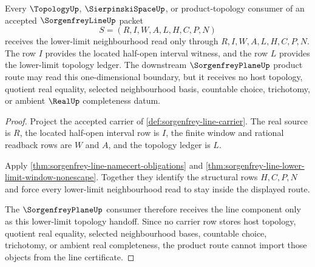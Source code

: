 \begin{theorem}
\label{thm:sorgenfrey-line-lower-limit-topology-handoff}
Every $\TopologyUp$, $\SierpinskiSpaceUp$, or product-topology consumer of an accepted $\SorgenfreyLineUp$ packet
$$
S=(R,I,W,A,L,H,C,P,N)
$$
receives the lower-limit neighbourhood read only through $R,I,W,A,L,H,C,P,N$. The row $I$ provides the located half-open interval witness, and the row $L$ provides the lower-limit topology ledger. The downstream $\SorgenfreyPlaneUp$ product route may read this one-dimensional boundary, but it receives no host topology, quotient real equality, selected neighbourhood basis, countable choice, trichotomy, or ambient $\RealUp$ completeness datum.
\end{theorem}
\begin{proof}
Project the accepted carrier of \autoref{def:sorgenfrey-line-carrier}. The real source is $R$, the located half-open interval row is $I$, the finite window and rational readback rows are $W$ and $A$, and the topology ledger is $L$.

Apply \autoref{thm:sorgenfrey-line-namecert-obligations} and \autoref{thm:sorgenfrey-line-lower-limit-window-nonescape}. Together they identify the structural rows $H,C,P,N$ and force every lower-limit neighbourhood read to stay inside the displayed route.

The $\SorgenfreyPlaneUp$ consumer therefore receives the line component only as this lower-limit topology handoff. Since no carrier row stores host topology, quotient real equality, selected neighbourhood bases, countable choice, trichotomy, or ambient real completeness, the product route cannot import those objects from the line certificate.
\end{proof}


\begin{closurestatus}{\SorgenfreyLineUp}
  \theoryclosure{\seedClosure}
  \formalstatus{\unformalizedV}
\end{closurestatus}
